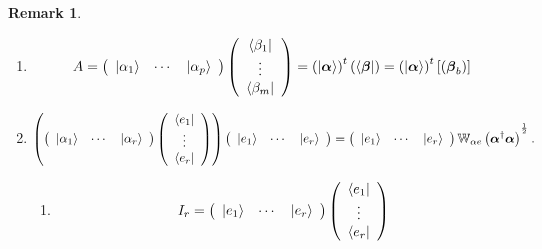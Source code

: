 \documentclass[aps,preprint]{revtex4}%
\newtheorem{remark}[theorem]{Remark}
\begin{document}
\begin{remark}
\begin{enumerate}
\begin{enumerate}
\item
\begin{equation}
A=\left(
\begin{array}
[c]{ccc}%
\left\vert \alpha_{1}\right\rangle  & \cdots & \left\vert \alpha
_{p}\right\rangle
\end{array}
\right)  \left(
\begin{array}
[c]{c}%
\left\langle \beta_{1}\right\vert \\
\vdots\\
\left\langle \beta_{m}\right\vert
\end{array}
\right)  =\left(  \left\vert \boldsymbol{\alpha}\right\rangle \right)
^{t}\left(  \left\langle \boldsymbol{\beta}\right\vert \right)  =\left(
\left\vert \boldsymbol{\alpha}\right\rangle \right)  ^{t}\left[  \left(
\boldsymbol{\beta}_{b}\right)  \right]
\end{equation}


\item
\begin{equation}
\left(  \left(
\begin{array}
[c]{ccc}%
\left\vert \alpha_{1}\right\rangle  & \cdots & \left\vert \alpha
_{r}\right\rangle
\end{array}
\right)  \left(
\begin{array}
[c]{c}%
\left\langle e_{1}\right\vert \\
\vdots\\
\left\langle e_{r}\right\vert
\end{array}
\right)  \right)  \left(
\begin{array}
[c]{ccc}%
\left\vert e_{1}\right\rangle  & \cdots & \left\vert e_{r}\right\rangle
\end{array}
\right)  =\left(
\begin{array}
[c]{ccc}%
\left\vert e_{1}\right\rangle  & \cdots & \left\vert e_{r}\right\rangle
\end{array}
\right)  \mathbb{W}_{\alpha e}\left(  \boldsymbol{\alpha}^{\dagger
}\boldsymbol{\alpha}\right)  ^{^{\frac{1}{2}}}.
\end{equation}


\begin{enumerate}
\item
\begin{equation}
I_{r}=\left(
\begin{array}
[c]{ccc}%
\left\vert e_{1}\right\rangle  & \cdots & \left\vert e_{r}\right\rangle
\end{array}
\right)  \left(
\begin{array}
[c]{c}%
\left\langle e_{1}\right\vert \\
\vdots\\
\left\langle e_{r}\right\vert
\end{array}
\right)
\end{equation}



\end{enumerate}
\end{enumerate}
\end{enumerate}
\end{remark}
\end{document}
